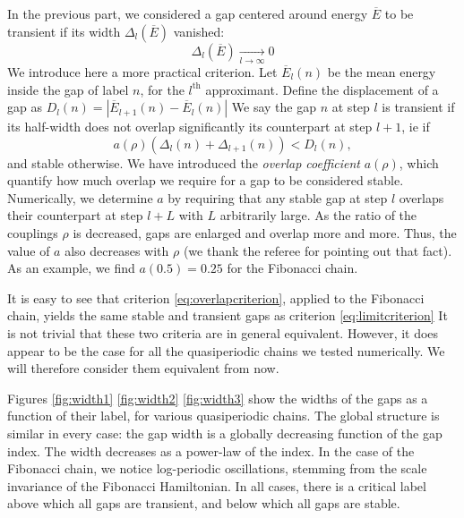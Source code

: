 \documentclass[a4paper]{jpconf}
\begin{document}
In the previous part, we considered a gap centered around energy $\overline{E}$ to be transient if its width $\Delta_l(\overline{E})$ vanished:
\begin{equation}
\label{eq:limitcriterion}
	\Delta_l(\overline{E}) \xrightarrow[l \to \infty]{} 0
\end{equation}
We introduce here a more practical criterion.
Let $\overline{E}_l(n)$ be the mean energy inside the gap of label $n$, for the $l^\text{th}$ approximant.
Define the displacement of a gap as $D_l(n) = |\overline{E}_{l+1}(n) - \overline{E}_l(n)| $
We say the gap $n$ at step $l$ is transient if its half-width does not overlap significantly its counterpart at step $l+1$, ie if 
\begin{equation}
\label{eq:overlapcriterion}
	a(\rho) ( \Delta_l(n) + \Delta_{l+1}(n) ) < D_l(n),
\end{equation}
and stable otherwise.
We have introduced the \emph{overlap coefficient} $a(\rho)$, which quantify how much overlap we require for a gap to be considered stable.
Numerically, we determine $a$ by requiring that any stable gap at step $l$ overlaps their counterpart at step $l+L$ with $L$ arbitrarily large.
As the ratio of the couplings $\rho$ is decreased, gaps are enlarged and overlap more and more.
Thus, the value of $a$ also decreases with $\rho$ (we thank the referee for pointing out that fact).
As an example, we find $a(0.5) = 0.25$ for the Fibonacci chain.

It is easy to see that criterion \eqref{eq:overlapcriterion}, applied to the Fibonacci chain, yields the same stable and transient gaps as criterion \eqref{eq:limitcriterion} 
It is not trivial that these two criteria are in general equivalent.
However, it does appear to be the case for all the quasiperiodic chains we tested numerically. 
We will therefore consider them equivalent from now.

Figures \eqref{fig:width1} \eqref{fig:width2} \eqref{fig:width3} show the widths of the gaps as a function of their label, for various quasiperiodic chains.
The global structure is similar in every case: the gap width is a globally decreasing function of the gap index. 
The width decreases as a power-law of the index.
In the case of the Fibonacci chain, we notice log-periodic oscillations, stemming from the scale invariance of the Fibonacci Hamiltonian.
In all cases, there is a critical label above which all gaps are transient, and below which all gaps are stable.

\end{document}
